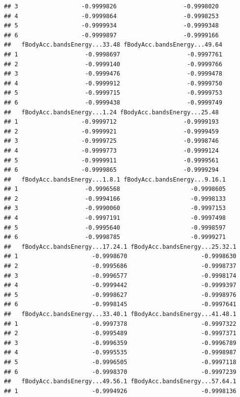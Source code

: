 \documentclass[
]{article}
\begin{document}
\begin{verbatim}
## 3                  -0.9999826                   -0.9998020
## 4                  -0.9999864                   -0.9998253
## 5                  -0.9999934                   -0.9999348
## 6                  -0.9999897                   -0.9999166
##   fBodyAcc.bandsEnergy...33.48 fBodyAcc.bandsEnergy...49.64
## 1                   -0.9998697                   -0.9997761
## 2                   -0.9999140                   -0.9999766
## 3                   -0.9999476                   -0.9999478
## 4                   -0.9999912                   -0.9999750
## 5                   -0.9999715                   -0.9999753
## 6                   -0.9999438                   -0.9999749
##   fBodyAcc.bandsEnergy...1.24 fBodyAcc.bandsEnergy...25.48
## 1                  -0.9999712                   -0.9999193
## 2                  -0.9999921                   -0.9999459
## 3                  -0.9999725                   -0.9998746
## 4                  -0.9999773                   -0.9999124
## 5                  -0.9999911                   -0.9999561
## 6                  -0.9999865                   -0.9999294
##   fBodyAcc.bandsEnergy...1.8.1 fBodyAcc.bandsEnergy...9.16.1
## 1                   -0.9996568                    -0.9998605
## 2                   -0.9994166                    -0.9998133
## 3                   -0.9990060                    -0.9997153
## 4                   -0.9997191                    -0.9997498
## 5                   -0.9995640                    -0.9998597
## 6                   -0.9998785                    -0.9999271
##   fBodyAcc.bandsEnergy...17.24.1 fBodyAcc.bandsEnergy...25.32.1
## 1                     -0.9998670                     -0.9998630
## 2                     -0.9995686                     -0.9998737
## 3                     -0.9996577                     -0.9998174
## 4                     -0.9999442                     -0.9999397
## 5                     -0.9998627                     -0.9998976
## 6                     -0.9998145                     -0.9997641
##   fBodyAcc.bandsEnergy...33.40.1 fBodyAcc.bandsEnergy...41.48.1
## 1                     -0.9997378                     -0.9997322
## 2                     -0.9995489                     -0.9997371
## 3                     -0.9996359                     -0.9996789
## 4                     -0.9995535                     -0.9998987
## 5                     -0.9996505                     -0.9997118
## 6                     -0.9998370                     -0.9997239
##   fBodyAcc.bandsEnergy...49.56.1 fBodyAcc.bandsEnergy...57.64.1
## 1                     -0.9994926                     -0.9998136

\end{verbatim}
\end{document}
